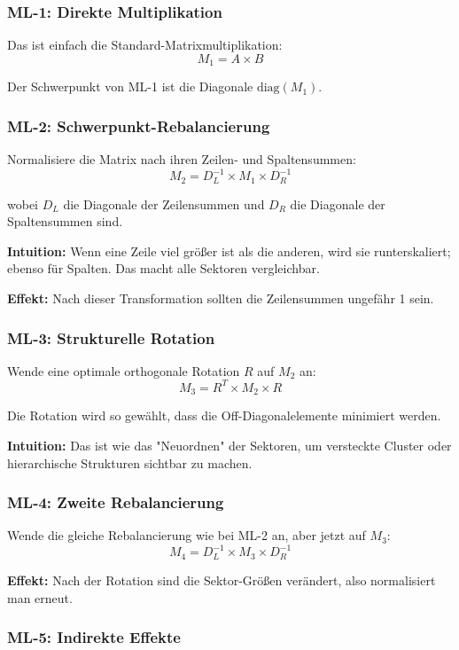 \documentclass[a4paper,12pt]{article}
\begin{document}
\subsubsection{ML-1: Direkte Multiplikation}

Das ist einfach die Standard-Matrixmultiplikation:
$$M_1 = A \times B$$

Der Schwerpunkt von ML-1 ist die Diagonale $\text{diag}(M_1)$.

\subsubsection{ML-2: Schwerpunkt-Rebalancierung}

Normalisiere die Matrix nach ihren Zeilen- und Spaltensummen:
$$M_2 = D_L^{-1} \times M_1 \times D_R^{-1}$$

wobei $D_L$ die Diagonale der Zeilensummen und $D_R$ die Diagonale der Spaltensummen sind.

\textbf{Intuition:} Wenn eine Zeile viel größer ist als die anderen, wird sie runterskaliert; ebenso für Spalten. Das macht alle Sektoren vergleichbar.

\textbf{Effekt:} Nach dieser Transformation sollten die Zeilensummen ungefähr 1 sein.

\subsubsection{ML-3: Strukturelle Rotation}

Wende eine optimale orthogonale Rotation $R$ auf $M_2$ an:
$$M_3 = R^T \times M_2 \times R$$

Die Rotation wird so gewählt, dass die Off-Diagonalelemente minimiert werden.

\textbf{Intuition:} Das ist wie das "Neuordnen" der Sektoren, um versteckte Cluster oder hierarchische Strukturen sichtbar zu machen.

\subsubsection{ML-4: Zweite Rebalancierung}

Wende die gleiche Rebalancierung wie bei ML-2 an, aber jetzt auf $M_3$:
$$M_4 = D_L^{-1} \times M_3 \times D_R^{-1}$$

\textbf{Effekt:} Nach der Rotation sind die Sektor-Größen verändert, also normalisiert man erneut.

\subsubsection{ML-5: Indirekte Effekte}
\end{document}
